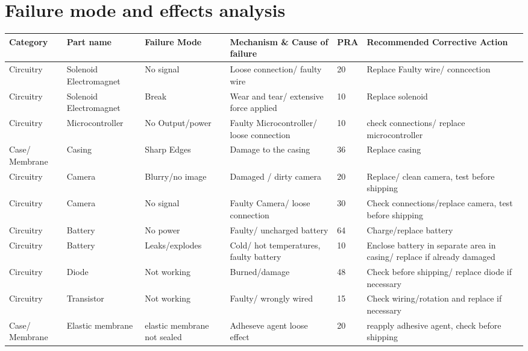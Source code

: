 \section{Failure mode and effects analysis}

    \begin{table}[!ht]
        \centering
        \begin{tabular}{b{1.7cm} b{2cm} b{2.5cm} b{4cm}l b{6cm}} 
            \textbf{Category} & \textbf{Part name} & \textbf{Failure Mode} & \textbf{Mechanism \& Cause of failure} & \textbf{PRA} & \textbf{Recommended Corrective Action} \\ \hline
            Circuitry & Solenoid Electromagnet & No signal & Loose connection/ faulty wire & 20 & Replace Faulty wire/ conncection \\ 
            Circuitry & Solenoid Electromagnet & Break  & Wear and tear/ extensive force applied & 10 & Replace solenoid \\ 
            Circuitry & Microcontroller & No Output/power & Faulty Microcontroller/ loose connection & 10 & check connections/ replace microcontroller \\ 
            Case/ Membrane & Casing & Sharp Edges & Damage to the casing  & 36 & Replace casing \\ 
            Circuitry & Camera & Blurry/no image & Damaged / dirty camera & 20 & Replace/ clean camera, test before shipping \\ 
            Circuitry & Camera  & No signal & Faulty Camera/ loose connection & 30 & Check connections/replace camera, test before shipping \\ 
            Circuitry & Battery & No power & Faulty/ uncharged battery & 64 & Charge/replace battery \\ 
            Circuitry & Battery & Leaks/explodes & Cold/ hot temperatures, faulty battery & 10 & Enclose battery in separate area in casing/ replace if already damaged \\ 
            Circuitry & Diode & Not working & Burned/damage & 48 & Check before shipping/ replace diode if necessary \\ 
            Circuitry & Transistor  & Not working & Faulty/ wrongly wired & 15 & Check wiring/rotation and replace if necessary \\ 
            Case/ Membrane & Elastic membrane & elastic membrane not sealed & Adheseve agent loose effect & 20 & reapply adhesive agent, check before shipping \\ 

\end{tabular}
\end{table}
